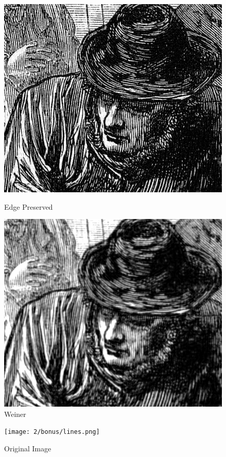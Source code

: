 \documentclass{article}
\begin{document}
    \begin{figure}[!htb]
      \includegraphics[scale=0.33]{2/bonus/recovered_zoom.png}
      \caption{Edge Preserved}
    \endminipage\hfill
      \includegraphics[scale=0.3]{2/bonus/weiner_zoom.png}
      \caption{Weiner}
    \endminipage
    \end{figure}
    
    
    \pagebreak
    \begin{figure}
        \texttt{[image: 2/bonus/lines.png]}
        \caption{Original Image}
        \label{fig:my_label}
    \end{figure}
    
\end{document}
